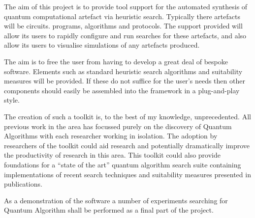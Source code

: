 The aim of this project is to provide tool support for the automated synthesis of quantum computational artefact via heuristic search.
Typically there artefacts will be circuits. programs, algorithms and protocols.
The support provided will allow its users to rapidly configure and run searches for these artefacts, and also allow its users to visualise simulations of any artefacts produced.

The aim is to free the user from having to develop a great deal of bespoke software.
Elements such as standard heuristic search algorithms and suitability measures will be provided.
If these do not suffice for the user's needs then other components should easily be assembled into the framework in a plug-and-play style.

The creation of such a toolkit is, to the best of my knowledge, unprecedented.
All previous work in the area has focussed purely on the discovery of Quantum Algorithms with each researcher working in isolation.
The adoption by researchers of the toolkit could aid research and potentially dramatically improve the productivity of research in this area.
This toolkit could also provide foundations for a ``state of the art'' quantum algorithm search suite containing implementations of recent search techniques and suitability measures presented in publications.

As a demonstration of the software a number of experiments searching for Quantum Algorithm shall be performed as a final part of the project.




